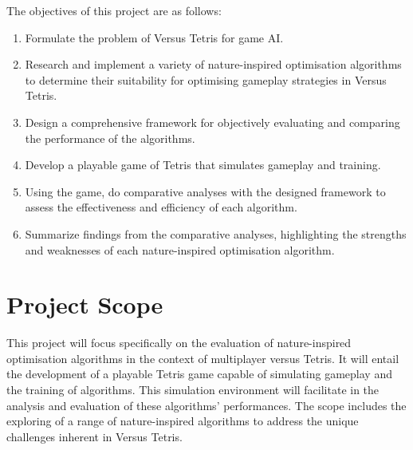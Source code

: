 \documentclass[a4paper, 12pt]{extreport}
\begin{document}
			The objectives of this project are as follows:
			
			\begin{enumerate}
				\item Formulate the problem of Versus Tetris for game AI.
				\item Research and implement a variety of nature-inspired optimisation algorithms to determine their suitability for optimising gameplay strategies in Versus Tetris.
				\item Design a comprehensive framework for objectively evaluating and comparing the performance of the algorithms.
				\item Develop a playable game of Tetris that simulates gameplay and training.
				\item Using the game, do comparative analyses with the designed framework to assess the effectiveness and efficiency of each algorithm.
				\item Summarize findings from the comparative analyses, highlighting the strengths and weaknesses of each nature-inspired optimisation algorithm.
			\end{enumerate}
		
		\section{Project Scope}
			
			
			This project will focus specifically on the evaluation of nature-inspired optimisation algorithms in the context of multiplayer versus Tetris. It will entail the development of a playable Tetris game capable of simulating gameplay and the training of algorithms. This simulation environment will facilitate in the analysis and evaluation of these algorithms' performances. The scope includes the exploring of a range of nature-inspired algorithms to address the unique challenges inherent in Versus Tetris.
			
		
	
\end{document}
